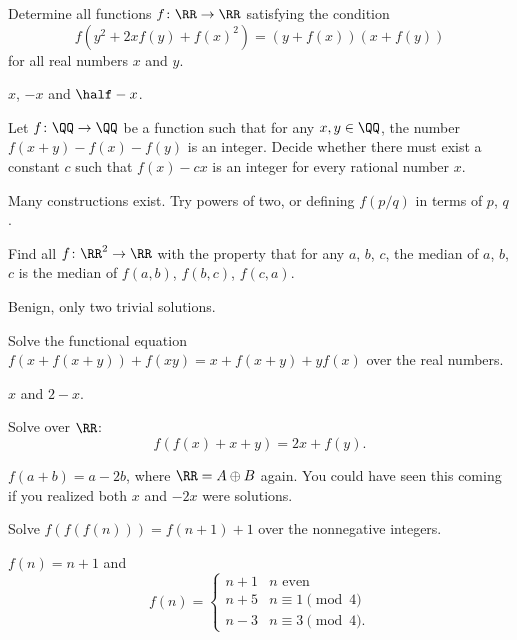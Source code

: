 \documentclass[11pt]{scrartcl}
\begin{document}
\begin{problem}
  [EGMO 2012/6]
  Determine all functions $f \colon \RR \to \RR$ satisfying the condition
  \[f(y^2+2xf(y)+f(x)^2)=(y+f(x))(x+f(y))\]
  for all real numbers $x$ and $y$.
  \begin{hint}
    $x$, $-x$ and $\half - x$.
  \end{hint}
\end{problem}

\begin{problem}
  Let $f \colon \QQ \to \QQ$ be a function such that for any $x,y \in \QQ$,
  the number $f(x+y)-f(x)-f(y)$ is an integer.
  Decide whether there must exist a constant $c$ such that $f(x) - cx$
  is an integer for every rational number $x$.
  \begin{hint}
    Many constructions exist. Try powers of two, or defining $f(p/q)$ in terms of $p$, $q$.
  \end{hint}
\end{problem}

\begin{problem}
  [TSTST 2011/1]
  Find all $f \colon \RR^2 \to \RR$ with the property that for any $a$, $b$, $c$,
  the median of $a$, $b$, $c$ is the median of $f(a,b)$, $f(b,c)$, $f(c,a)$.
  \begin{hint}
    Benign, only two trivial solutions.
  \end{hint}
\end{problem}

\begin{problem}
  [IMO 2015/5]
  Solve the functional equation $f(x+f(x+y)) + f(xy) = x + f(x+y) + yf(x)$
  over the real numbers.
  \begin{hint}
    $x$ and $2-x$.
  \end{hint}
\end{problem}

\begin{problem}
  [Kazakhstan 2005]
  \label{prob:kaz}
  Solve over $\RR$: \[ f(f(x)+x+y)=2x+f(y). \]
  \begin{hint}
    $f(a+b) = a-2b$, where $\RR = A \oplus B$ again.
    You could have seen this coming if you realized both $x$ and $-2x$ were solutions.
  \end{hint}
\end{problem}

\begin{problem}
  [Shortlist 2013 A5]
  Solve $f(f(f(n))) = f(n+1)+1$ over the nonnegative integers.
  \begin{hint}
    $f(n) = n+1$ and \[
      f(n) = \begin{cases}
        n+1 & n \text{ even} \\
        n+5 & n \equiv 1 \pmod 4 \\
        n-3 & n\equiv 3 \pmod 4.
      \end{cases} \]
  \end{hint}
\end{problem}
\end{document}
